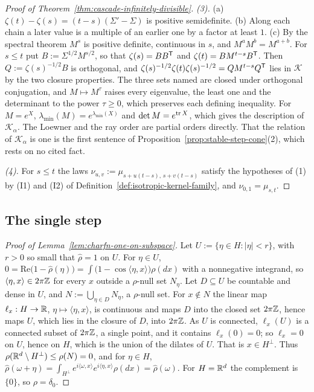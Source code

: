 \begin{proof}[Proof of Theorem~\ref{thm:cascade-infinitely-divisible}]
\emph{(3).} (a) $\zeta(t) - \zeta(s) = (t - s)(\Sigma' - \Sigma)$ is positive semidefinite. (b)
Along each chain a later value is a multiple of an earlier one by a factor at least $1$. (c) By the
spectral theorem $M^s$ is positive definite, continuous in $s$, and $M^aM^b = M^{a+b}$. For
$s \le t$ put $B := \Sigma^{1/2}M^{s/2}$, so that $\zeta(s) = BB^{\mathsf{T}}$ and
$\zeta(t) = BM^{t-s}B^{\mathsf{T}}$. Then $Q := \zeta(s)^{-1/2}B$ is orthogonal, and
$\zeta(s)^{-1/2}\zeta(t)\zeta(s)^{-1/2} = QM^{t-s}Q^{\mathsf{T}}$ lies in $\mathcal K$ by the two
closure properties. The three sets named are closed under orthogonal conjugation, and
$M \mapsto M^\tau$ raises every eigenvalue, the least one and the determinant to the power
$\tau \ge 0$, which preserves each defining inequality. For $M = e^X$, $\lambda_{\min}(M) =
e^{\lambda_{\min}(X)}$ and $\det M = e^{\operatorname{tr} X}$, which gives the description of $\mathcal K_\alpha$.
The Loewner and the ray order are partial orders directly. That the relation of $\mathcal K_\alpha$
is one is the first sentence of Proposition~\ref{prop:stable-step-cone}(2), which rests on no cited fact.

\emph{(4).} For $s \le t$ the laws $\nu_{u,v} := \mu_{s + u(t-s),\,s + v(t-s)}$ satisfy the hypotheses
of (1) by (I1) and (I2) of Definition~\ref{def:isotropic-kernel-family}, and
$\nu_{0,1} = \mu_{s,t}$.
\end{proof}

\subsection{The single step}

\begin{proof}[Proof of Lemma~\ref{lem:charfn-one-on-subspace}]
Let $U := \{\eta \in H : |\eta| < r\}$, with $r > 0$ so small that $\widehat\rho = 1$ on $U$. For
$\eta \in U$, $0 = \mathrm{Re}\bigl(1 - \widehat\rho(\eta)\bigr)
= \int\bigl(1 - \cos\langle\eta,x\rangle\bigr)\rho(dx)$ with a nonnegative integrand, so
$\langle\eta,x\rangle \in 2\pi\mathbb{Z}$ for every $x$ outside a $\rho$-null set $N_\eta$. Let
$D \subseteq U$ be countable and dense in $U$, and $N := \bigcup_{\eta\in D}N_\eta$, a $\rho$-null
set. For $x \notin N$ the linear map $\ell_x : H \to \mathbb{R}$, $\eta \mapsto \langle\eta,x\rangle$, is
continuous and maps $D$ into the closed set $2\pi\mathbb{Z}$, hence maps $U$, which lies in the closure
of $D$, into $2\pi\mathbb{Z}$. As $U$ is connected, $\ell_x(U)$ is a connected subset of $2\pi\mathbb{Z}$, a
single point, and it contains $\ell_x(0) = 0$; so $\ell_x = 0$ on $U$, hence on $H$, which is the
union of the dilates of $U$. That is $x \in H^\perp$. Thus $\rho(\mathbb{R}^d \setminus
H^\perp) \le \rho(N) = 0$, and for $\eta \in H$,
$\widehat\rho(\omega+\eta) = \int_{H^\perp}e^{i\langle\omega,x\rangle}e^{i\langle\eta,x\rangle}\rho(dx)
= \widehat\rho(\omega)$. For $H = \mathbb{R}^d$ the complement is $\{0\}$, so $\rho = \delta_0$.
\end{proof}

